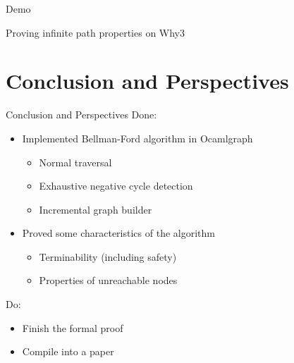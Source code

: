 \documentclass{beamer}
\begin{document}
\begin{frame}

\Huge \alert{Demo}\vspace{8pt}

\large Proving infinite path properties on Why3

\end{frame}

\section{Conclusion and Perspectives}

\begin{frame}{Conclusion and Perspectives}
Done:

\begin{itemize}
\item Implemented Bellman-Ford algorithm in Ocamlgraph
\begin{itemize}
\item Normal traversal
\item Exhaustive negative cycle detection
\item Incremental graph builder
\end{itemize}

\item Proved some characteristics of the algorithm
\begin{itemize}
\item Terminability (including safety)
\item Properties of unreachable nodes
\end{itemize}
\end{itemize}

Do:
\begin{itemize}
\item Finish the formal proof
\item Compile into a paper
\end{itemize}
\end{frame}
\end{document}
